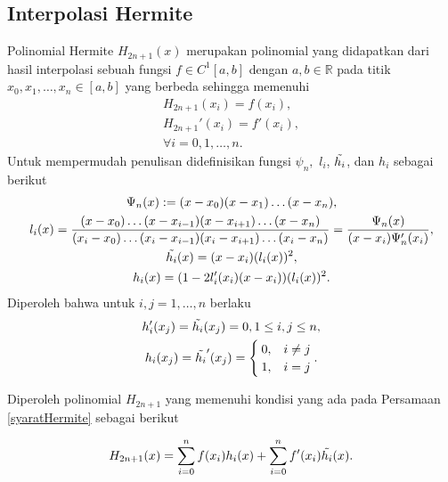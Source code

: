 \subsection{Interpolasi Hermite}
Polinomial Hermite \(H_{2n+1}(x)\) merupakan polinomial yang didapatkan dari hasil interpolasi sebuah fungsi \(f \in C^1[a,b]\) dengan \(a,b \in \mathbb{R}\) pada titik \mbox{\(x_0,x_1,\dots,x_n \in [a,b]\)} yang berbeda sehingga memenuhi
\begin{equation}
\begin{gathered}\label{syaratHermite}
	H_{2n+1}(x_i) = f(x_i),\\
	H_{2n+1}'(x_i) = f'(x_i),\\
	\forall i = 0,1,\dots,n.
\end{gathered}
\end{equation}
Untuk mempermudah penulisan didefinisikan fungsi $\psi_n,$ $l_i$, $\Tilde{h_i}$, dan $h_i$  sebagai berikut
\begin{equation*}
    \begin{gathered}
        \Psi_n(x) := (x-x_0)(x-x_1)\dots(x-x_n), \\
        l_i(x) = \frac{(x-x_0)\dots(x-x_{i-1})(x-x_{i+1})\dots(x-x_n)}{(x_i-x_0)\dots(x_i-x_{i-1})(x_i-x_{i+1})\dots(x_i-x_n)} = \frac{\Psi_n(x)}{(x-x_i)\Psi_n'(x_i)}, \\
        \Tilde{h_i}(x) = (x-x_i)(l_i(x))^2,\\
        h_i(x) = (1-2l_i'(x_i)(x-x_i))(l_i(x))^2.
    \end{gathered}
\end{equation*}
Diperoleh bahwa untuk $i,j = 1,\dots,n$ berlaku
\begin{equation*}
    \begin{gathered}
        h_i'(x_j) = \Tilde{h_i}(x_j) = 0, 1 \leq i,j \leq n,\\
        h_i(x_j) = \Tilde{h_i}'(x_j) = 
        \begin{cases}
        0, &i\neq j \\
        1, &i=j
        \end{cases}.
    \end{gathered}
\end{equation*}

Diperoleh polinomial $H_{2n+1}$ yang memenuhi kondisi yang ada pada Persamaan \eqref{syaratHermite} sebagai berikut

\begin{equation}\label{HermiteLagrange}
    H_{2n+1}(x) = \sum_{i=0}^{n}f(x_i)h_i(x) + \sum_{i=0}^{n}f'(x_i)\Tilde{h_i}(x).
\end{equation}

